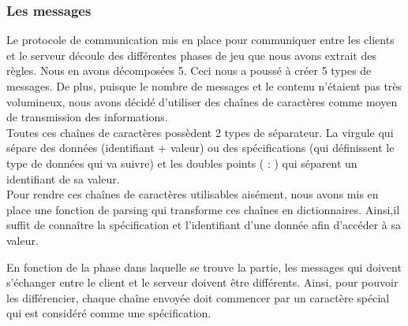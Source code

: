 \documentclass[a4paper,11pt]{article}
\begin{document}
\subsubsection{Les messages} 

    Le protocole de communication mis en place pour communiquer entre les clients et le serveur découle des différentes phases de jeu que nous avons extrait des règles. Nous en avons décomposées 5. Ceci nous a poussé à créer 5 types de messages. De plus, puisque le nombre de messages et le contenu n’étaient pas très volumineux, nous avons décidé d’utiliser des chaînes de caractères comme moyen de transmission des informations. \\

	Toutes ces chaînes de caractères possèdent 2 types de séparateur. La virgule qui sépare des données (identifiant + valeur) ou des spécifications (qui définissent le type de données qui va suivre) et les doubles points ( : ) qui séparent un identifiant de sa valeur. \\
	
	Pour rendre ces chaînes de caractères utilisables aisément, nous avons mis en place une fonction de parsing qui transforme ces chaînes en dictionnaires. Ainsi,il suffit de connaître la spécification et l’identifiant d’une donnée afin d’accéder à sa valeur.

    En fonction de la phase dans laquelle se trouve la partie, les messages qui doivent s’échanger entre le client et le serveur doivent être différents. Ainsi, pour pouvoir les différencier, chaque chaîne envoyée doit commencer par un caractère spécial qui est considéré comme une spécification. \\
\end{document}
